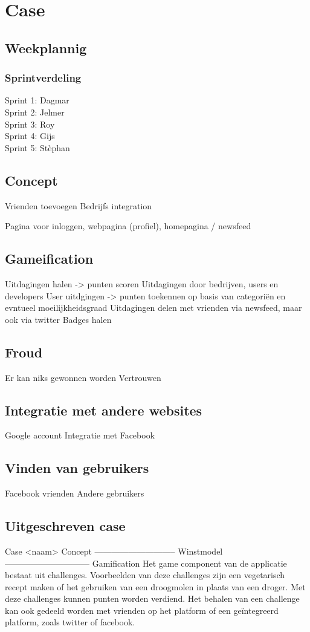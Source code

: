 \documentclass[11pt,fleqn,oneside,openany]{book} %
\begin{document}
\chapter{Case}
\section{Weekplannig}
\subsection{Sprintverdeling}
Sprint 1: Dagmar \\
Sprint 2: Jelmer \\
Sprint 3: Roy \\
Sprint 4: Gijs \\
Sprint 5: Stèphan \\

\section{Concept}
Vrienden toevoegen
Bedrijfs integration

Pagina voor inloggen, webpagina (profiel), homepagina / newsfeed

\section{Gameification}
Uitdagingen halen -> punten scoren
Uitdagingen door bedrijven, users en developers
User uitdgingen -> punten toekennen op basis van categoriën en evntueel moeilijkheidsgraad
Uitdagingen delen met vrienden via newsfeed, maar ook via twitter
Badges halen

\section{Froud}
Er kan niks gewonnen worden
Vertrouwen

\section{Integratie met andere websites}
Google account
Integratie met Facebook

\section{Vinden van gebruikers}
Facebook vrienden
Andere gebruikers

\section{Uitgeschreven case}
Case <naam>
Concept
-----------------------------
Winstmodel
------------------------------
Gamification
Het game component van de applicatie bestaat uit challenges. Voorbeelden van deze challenges zijn een vegetarisch recept maken of het gebruiken van een droogmolen in plaats van een droger. Met deze challenges kunnen punten worden verdiend. Het behalen van een challenge kan ook gedeeld worden met vrienden op het platform of een geïntegreerd platform, zoals twitter of facebook.
\end{document}
